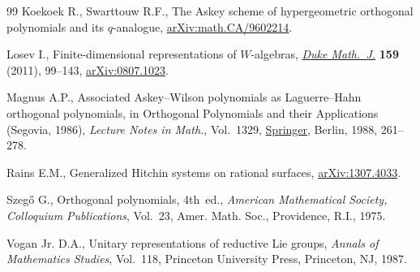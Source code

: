 \begin{thebibliography}{99}
Koekoek R., Swarttouw R.F., The {A}skey scheme of hypergeometric orthogonal
 polynomials and its $q$-analogue, \href{https://arxiv.org/abs/math.CA/9602214}{arXiv:math.CA/9602214}.

Losev I., Finite-dimensional representations of {$W$}-algebras, \href{https://doi.org/10.1215/00127094-1384800}{\textit{Duke
 Math.~J.}} \textbf{159} (2011), 99--143, \href{https://arxiv.org/abs/0807.1023}{arXiv:0807.1023}.

Magnus A.P., Associated {A}skey--{W}ilson polynomials as {L}aguerre--{H}ahn
 orthogonal polynomials, in Orthogonal Polynomials and their Applications
 ({S}egovia, 1986), \textit{Lecture Notes in Math.}, Vol.~1329, \href{https://doi.org/10.1007/BFb0083366}{Springer},
 Berlin, 1988, 261--278.

Rains E.M., Generalized {H}itchin systems on rational surfaces,
 \href{https://arxiv.org/abs/1307.4033}{arXiv:1307.4033}.

Szeg\H{o} G., Orthogonal polynomials, 4th~ed., \textit{American Mathematical Society,
 Colloquium Publications}, Vol.~23, Amer. Math. Soc., Providence,
 R.I., 1975.

Vogan Jr. D.A., Unitary representations of reductive {L}ie groups,
 \textit{Annals of Mathematics Studies}, Vol.~118, Princeton University Press,
 Princeton, NJ, 1987.

\end{thebibliography}
